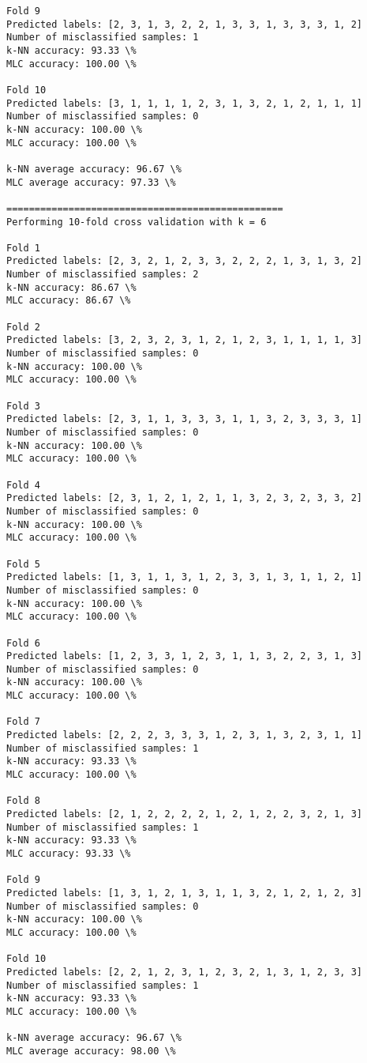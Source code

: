 \documentclass[11pt]{article}
\begin{document}
\begin{Verbatim}[commandchars=\\\{\}]
Fold 9
Predicted labels: [2, 3, 1, 3, 2, 2, 1, 3, 3, 1, 3, 3, 3, 1, 2]
Number of misclassified samples: 1
k-NN accuracy: 93.33 \%
MLC accuracy: 100.00 \%

Fold 10
Predicted labels: [3, 1, 1, 1, 1, 2, 3, 1, 3, 2, 1, 2, 1, 1, 1]
Number of misclassified samples: 0
k-NN accuracy: 100.00 \%
MLC accuracy: 100.00 \%

k-NN average accuracy: 96.67 \%
MLC average accuracy: 97.33 \%

=================================================
Performing 10-fold cross validation with k = 6

Fold 1
Predicted labels: [2, 3, 2, 1, 2, 3, 3, 2, 2, 2, 1, 3, 1, 3, 2]
Number of misclassified samples: 2
k-NN accuracy: 86.67 \%
MLC accuracy: 86.67 \%

Fold 2
Predicted labels: [3, 2, 3, 2, 3, 1, 2, 1, 2, 3, 1, 1, 1, 1, 3]
Number of misclassified samples: 0
k-NN accuracy: 100.00 \%
MLC accuracy: 100.00 \%

Fold 3
Predicted labels: [2, 3, 1, 1, 3, 3, 3, 1, 1, 3, 2, 3, 3, 3, 1]
Number of misclassified samples: 0
k-NN accuracy: 100.00 \%
MLC accuracy: 100.00 \%

Fold 4
Predicted labels: [2, 3, 1, 2, 1, 2, 1, 1, 3, 2, 3, 2, 3, 3, 2]
Number of misclassified samples: 0
k-NN accuracy: 100.00 \%
MLC accuracy: 100.00 \%

Fold 5
Predicted labels: [1, 3, 1, 1, 3, 1, 2, 3, 3, 1, 3, 1, 1, 2, 1]
Number of misclassified samples: 0
k-NN accuracy: 100.00 \%
MLC accuracy: 100.00 \%

Fold 6
Predicted labels: [1, 2, 3, 3, 1, 2, 3, 1, 1, 3, 2, 2, 3, 1, 3]
Number of misclassified samples: 0
k-NN accuracy: 100.00 \%
MLC accuracy: 100.00 \%

Fold 7
Predicted labels: [2, 2, 2, 3, 3, 3, 1, 2, 3, 1, 3, 2, 3, 1, 1]
Number of misclassified samples: 1
k-NN accuracy: 93.33 \%
MLC accuracy: 100.00 \%

Fold 8
Predicted labels: [2, 1, 2, 2, 2, 2, 1, 2, 1, 2, 2, 3, 2, 1, 3]
Number of misclassified samples: 1
k-NN accuracy: 93.33 \%
MLC accuracy: 93.33 \%

Fold 9
Predicted labels: [1, 3, 1, 2, 1, 3, 1, 1, 3, 2, 1, 2, 1, 2, 3]
Number of misclassified samples: 0
k-NN accuracy: 100.00 \%
MLC accuracy: 100.00 \%

Fold 10
Predicted labels: [2, 2, 1, 2, 3, 1, 2, 3, 2, 1, 3, 1, 2, 3, 3]
Number of misclassified samples: 1
k-NN accuracy: 93.33 \%
MLC accuracy: 100.00 \%

k-NN average accuracy: 96.67 \%
MLC average accuracy: 98.00 \%


\end{Verbatim}
\end{document}
